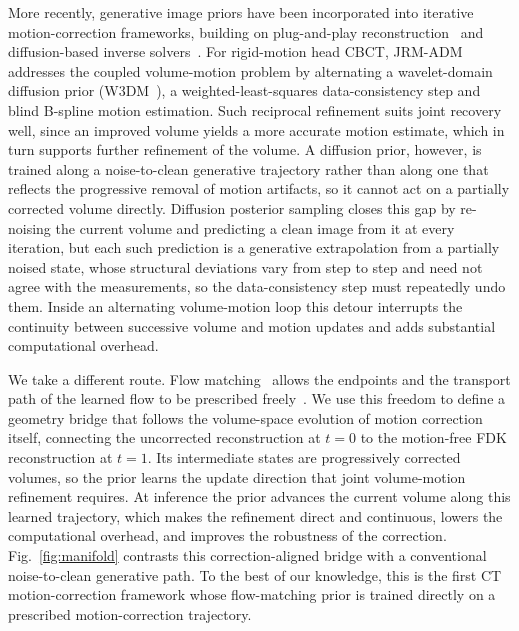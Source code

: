 \documentclass[11pt]{article}
\begin{document}
More recently, generative image priors have been incorporated into iterative
motion-correction frameworks, building on plug-and-play reconstruction~\cite{pnp13} and
diffusion-based inverse solvers~\cite{dds24}. For rigid-motion head CBCT,
JRM-ADM~\cite{depaepe25} addresses the coupled volume-motion problem by alternating a
wavelet-domain diffusion prior (W3DM~\cite{wdm24}), a weighted-least-squares
data-consistency step and blind B-spline motion estimation. Such reciprocal refinement
suits joint recovery well, since an improved volume yields a more accurate motion estimate,
which in turn supports further refinement of the volume. A diffusion prior, however, is
trained along a noise-to-clean generative trajectory rather than along one that reflects
the progressive removal of motion artifacts, so it cannot act on a partially corrected
volume directly. Diffusion posterior sampling closes this gap by re-noising the current
volume and predicting a clean image from it at every iteration, but each such prediction
is a generative extrapolation from a partially noised state, whose structural deviations
vary from step to step and need not agree with the measurements, so the data-consistency
step must repeatedly undo them. Inside an alternating volume-motion loop this detour interrupts the
continuity between successive volume and motion updates and adds substantial
computational overhead.

We take a different route. Flow matching~\cite{lipman23} allows the endpoints and the
transport path of the learned flow to be prescribed
freely~\cite{indi23,albergo23,i2sb23}. We use this freedom to define a geometry bridge that
follows the volume-space evolution of motion correction itself, connecting the uncorrected
reconstruction at $t{=}0$ to the motion-free FDK reconstruction at $t{=}1$. Its intermediate
states are progressively corrected volumes, so the prior learns the update direction that
joint volume-motion refinement requires. At inference the prior advances the current
volume along this learned trajectory, which makes the refinement direct and continuous,
lowers the computational overhead, and improves the robustness of the correction.
Fig.~\ref{fig:manifold} contrasts this correction-aligned bridge with a conventional
noise-to-clean generative path. To the best of our knowledge, this is the first CT
motion-correction framework whose flow-matching prior is trained directly on a prescribed
motion-correction trajectory.
\end{document}
